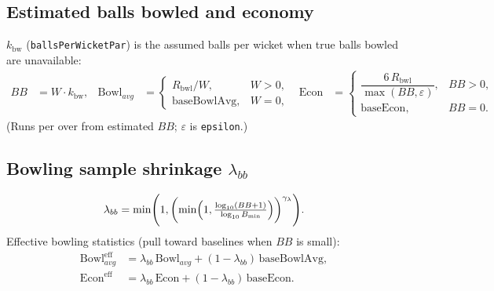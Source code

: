 \documentclass[12pt,a4paper]{article}
\begin{document}
\subsection{Estimated balls bowled and economy}
$k_{\mathrm{bw}}$ (\texttt{ballsPerWicketPar}) is the assumed balls per wicket when true balls bowled are unavailable:
\begin{align}
  BB &= W\cdot k_{\mathrm{bw}}, &
  \mathrm{Bowl}_{avg} &=
  \begin{cases}
    R_{\mathrm{bwl}}/W, & W>0,\\
    \mathrm{baseBowlAvg}, & W=0,
  \end{cases}
  &
  \mathrm{Econ} &=
  \begin{cases}
    \dfrac{6\,R_{\mathrm{bwl}}}{\max(BB,\varepsilon)}, & BB>0,\\
    \mathrm{baseEcon}, & BB=0.
  \end{cases}
\end{align}
(Runs per over from estimated $BB$; $\varepsilon$ is \texttt{epsilon}.)

\subsection{Bowling sample shrinkage $\lambda_{bb}$}
\begin{equation}
  \lambda_{bb}
  = \min\Biggl(1,\biggl(\min\Bigl(1,\tfrac{\log_{10}(BB+1)}{\log_{10}B_{\min}}\Bigr)\biggr)^{\gamma_\lambda}\Biggr).
\end{equation}
Effective bowling statistics (pull toward baselines when $BB$ is small):
\begin{align}
  \mathrm{Bowl}^{\mathrm{eff}}_{avg} &= \lambda_{bb}\,\mathrm{Bowl}_{avg} + (1-\lambda_{bb})\,\mathrm{baseBowlAvg}, \\
  \mathrm{Econ}^{\mathrm{eff}} &= \lambda_{bb}\,\mathrm{Econ} + (1-\lambda_{bb})\,\mathrm{baseEcon}.
\end{align}
\end{document}
